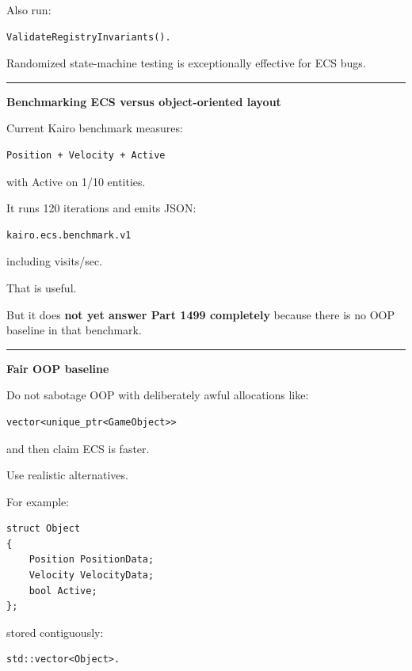 Also run:

\begin{verbatim}
ValidateRegistryInvariants().
\end{verbatim}

Randomized state-machine testing is exceptionally effective for ECS bugs.

\begin{center}\rule{0.5\linewidth}{0.5pt}\end{center}

\textbf{Benchmarking ECS versus object-oriented layout}

Current Kairo benchmark measures:

\begin{verbatim}
Position + Velocity + Active
\end{verbatim}

with Active on 1/10 entities.

It runs 120 iterations and emits JSON:

\begin{verbatim}
kairo.ecs.benchmark.v1
\end{verbatim}

including visits/sec.

That is useful.

But it does \textbf{not yet answer Part 1499 completely} because there is no OOP baseline in that benchmark.

\begin{center}\rule{0.5\linewidth}{0.5pt}\end{center}

\textbf{Fair OOP baseline}

Do not sabotage OOP with deliberately awful allocations like:

\begin{verbatim}
vector<unique_ptr<GameObject>>
\end{verbatim}

and then claim ECS is faster.

Use realistic alternatives.

For example:

\begin{verbatim}
struct Object
{
    Position PositionData;
    Velocity VelocityData;
    bool Active;
};
\end{verbatim}

stored contiguously:

\begin{verbatim}
std::vector<Object>.
\end{verbatim}

